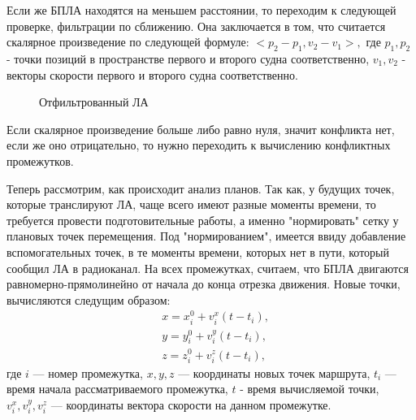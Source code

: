 \documentclass[a4paper,12pt]{article}
\begin{document}
Если же БПЛА находятся на меньшем расстоянии, то переходим к следующей проверке, фильтрации по сближению. Она заключается в том, что считается скалярное произведение по следующей формуле:
$<p_2 - p_1, v_2 - v_1 >,$
где $p_1, p_2$ - точки позиций в пространстве первого и второго судна соответственно, 
$v_1, v_2$ - векторы скорости первого и второго судна соответственно.
\begin{figure}[ht!]
    \caption{Отфильтрованный ЛА}\label{check_scalar_product}
\end{figure}

Если скалярное произведение больше либо равно нуля, значит конфликта нет, если же оно отрицательно, то нужно переходить к вычислению конфликтных промежутков.

Теперь рассмотрим, как происходит анализ планов. Так как, у будущих точек, которые транслируют ЛА, чаще всего имеют разные моменты времени, то требуется провести подготовительные работы, а именно "нормировать" сетку у плановых точек перемещения. Под "нормированием", имеется ввиду добавление вспомогательных точек, в те моменты времени, которых нет в пути, который сообщил ЛА в радиоканал. На всех промежутках, считаем, что БПЛА двигаются равномерно-прямолинейно от начала до конца отрезка движения. Новые точки, вычисляются следущим образом:
\begin{align*}
    &x = x_i^0 + v_i^x(t - t_{i}),\\
    &y = y_i^0 + v_i^y(t - t_{i}),\\
    &z = z_i^0 + v_i^z(t - t_{i}),
\end{align*}
где $i$ --- номер промежутка, $x, y, z$ --- координаты новых точек маршрута, $t_i$ --- время начала рассматриваемого промежутка, $t$ - время вычисляемой точки, $v_i^x,v_i^y,v_i^z$ --- координаты вектора скорости на данном промежутке.
\end{document}
